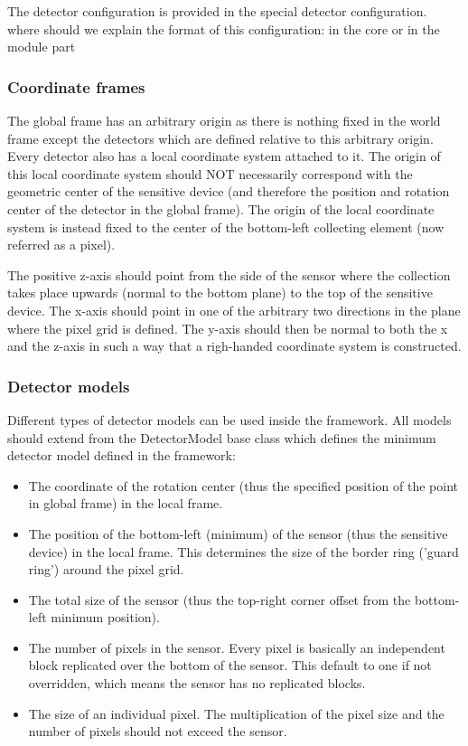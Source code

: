The detector configuration is provided in the special detector configuration. \todo where should we explain the format of this configuration: in the core or in the module part \todo

\subsubsection{Coordinate frames}
The global frame has an arbitrary origin as there is nothing fixed in the world frame except the detectors which are defined relative to this arbitrary origin. Every detector also has a local coordinate system attached to it. The origin of this local coordinate system should NOT necessarily correspond with the geometric center of the sensitive device (and therefore the position and rotation center of the detector in the global frame). The origin of the local coordinate system is instead fixed to the center of the bottom-left collecting element (now referred as a pixel). 

The positive z-axis should point from the side of the sensor where the collection takes place upwards (normal to the bottom plane) to the top of the sensitive device. The x-axis should point in one of the arbitrary two directions in the plane where the pixel grid is defined. The y-axis should then be normal to both the x and the z-axis in such a way that a righ-handed coordinate system is constructed. 

\subsubsection{Detector models}
Different types of detector models can be used inside the framework. All models should extend from the DetectorModel base class which defines the minimum detector model defined in the framework:
\begin{itemize}
\item The coordinate of the rotation center (thus the specified position of the point in global frame) in the local frame.
\item The position of the bottom-left (minimum) of the sensor (thus the sensitive device) in the local frame. This determines the size of the border ring ('guard ring') around the pixel grid. 
\item The total size of the sensor (thus the top-right corner offset from the bottom-left minimum position).
\item The number of pixels in the sensor. Every pixel is basically an independent block replicated over the bottom of the sensor. This default to one if not overridden, which means the sensor has no replicated blocks.
\item The size of an individual pixel. The multiplication of the pixel size and the number of pixels should not exceed the sensor.
\end{itemize}

